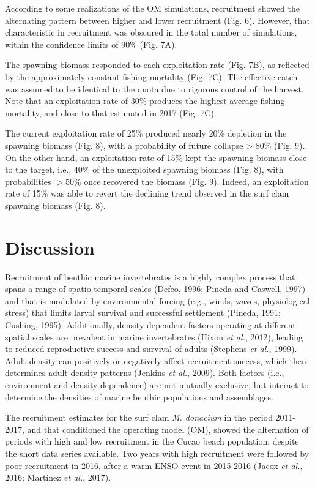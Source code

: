 \documentclass[12pt]{article}
\begin{document}
According to some realizations of the OM simulations, recruitment showed
the alternating pattern between higher and lower recruitment (Fig. 6).
However, that characteristic in recruitment was obscured in the total
number of simulations, within the confidence limits of 90\% (Fig. 7A).

The spawning biomass responded to each exploitation rate (Fig. 7B), as
reflected by the approximately constant fishing mortality (Fig. 7C). The
effective catch was assumed to be identical to the quota due to rigorous
control of the harvest. Note that an exploitation rate of 30\% produces
the highest average fishing mortality, and close to that estimated in
2017 (Fig. 7C).

The current exploitation rate of 25\% produced nearly 20\% depletion in
the spawning biomass (Fig. 8), with a probability of future collapse
\textgreater{} 80\% (Fig. 9). On the other hand, an exploitation rate of
15\% kept the spawning biomass close to the target, i.e., 40\% of the
unexploited spawning biomass (Fig. 8), with probabilities \(>50\)\% once
recovered the biomass (Fig. 9). Indeed, an exploitation rate of 15\% was
able to revert the declining trend observed in the surf clam spawning
biomass (Fig. 8).

\FloatBarrier

\hypertarget{discussion}{%
\section{Discussion}\label{discussion}}

Recruitment of benthic marine invertebrates is a highly complex process
that spans a range of spatio-temporal scales (Defeo, 1996; Pineda and
Caswell, 1997) and that is modulated by environmental forcing (e.g.,
winds, waves, physiological stress) that limits larval survival and
successful settlement (Pineda, 1991; Cushing, 1995). Additionally,
density-dependent factors operating at different spatial scales are
prevalent in marine invertebrates (Hixon \emph{et al.}, 2012), leading
to reduced reproductive success and survival of adults (Stephens
\emph{et al.}, 1999). Adult density can positively or negatively affect
recruitment success, which then determines adult density patterns
(Jenkins \emph{et al.}, 2009). Both factors (i.e., environment and
density-dependence) are not mutually exclusive, but interact to
determine the densities of marine benthic populations and assemblages.

The recruitment estimates for the surf clam \emph{M. donacium} in the
period 2011-2017, and that conditioned the operating model (OM), showed
the alternation of periods with high and low recruitment in the Cucao
beach population, despite the short data series available. Two years
with high recruitment were followed by poor recruitment in 2016, after a
warm ENSO event in 2015-2016 (Jacox \emph{et al.}, 2016; Martínez
\emph{et al.}, 2017).
\end{document}
